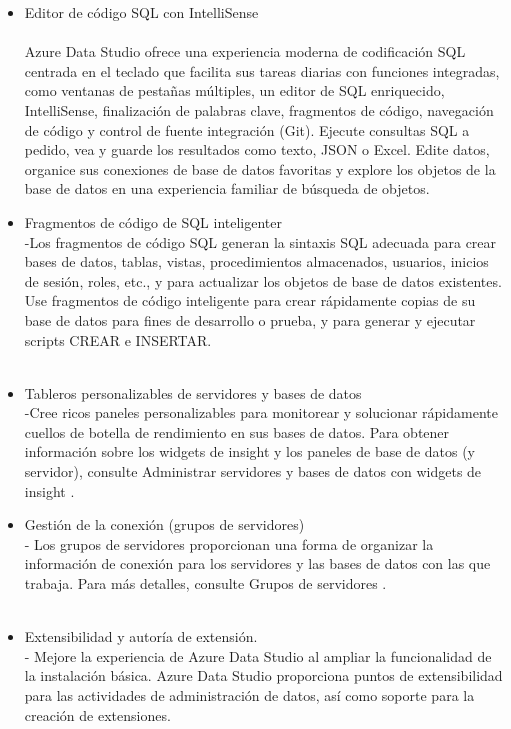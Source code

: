 \begin {itemize}
	\item Editor de código SQL con IntelliSense\\\\
	\subitem Azure Data Studio ofrece una experiencia moderna de codificación SQL centrada en el teclado que facilita sus tareas diarias con funciones integradas, como ventanas de pestañas múltiples, un editor de SQL enriquecido, IntelliSense, finalización de palabras clave, fragmentos de código, navegación de código y control de fuente integración (Git). Ejecute consultas SQL a pedido, vea y guarde los resultados como texto, JSON o Excel. Edite datos, organice sus conexiones de base de datos favoritas y explore los objetos de la base de datos en una experiencia familiar de búsqueda de objetos.
	\item Fragmentos de código de SQL inteligenter\\
	\subitem -Los fragmentos de código SQL generan la sintaxis SQL adecuada para crear bases de datos, tablas, vistas, procedimientos almacenados, usuarios, inicios de sesión, roles, etc., y para actualizar los objetos de base de datos existentes. Use fragmentos de código inteligente para crear rápidamente copias de su base de datos para fines de desarrollo o prueba, y para generar y ejecutar scripts CREAR e INSERTAR.\\\\
	\item Tableros personalizables de servidores y bases de datos\\
	\subitem -Cree ricos paneles personalizables para monitorear y solucionar rápidamente cuellos de botella de rendimiento en sus bases de datos. Para obtener información sobre los widgets de insight y los paneles de base de datos (y servidor), consulte Administrar servidores y bases de datos con widgets de insight .\\
	\item Gestión de la conexión (grupos de servidores)\\
	\subitem - Los grupos de servidores proporcionan una forma de organizar la información de conexión para los servidores y las bases de datos con las que trabaja. Para más detalles, consulte Grupos de servidores .\\\\
	\item Extensibilidad y autoría de extensión.\\
	\subitem - Mejore la experiencia de Azure Data Studio al ampliar la funcionalidad de la instalación básica. Azure Data Studio proporciona puntos de extensibilidad para las actividades de administración de datos, así como soporte para la creación de extensiones.\\
	
\end{itemize}





